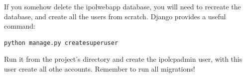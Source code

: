 If you somehow delete the ipolwebapp database, you will need to recreate the database, and create all the users from scratch. Django provides a useful command: 

\begin{lstlisting}[language=Python,firstnumber=1]
python manage.py createsuperuser
\end{lstlisting}

Run it from the project's directory and create the ipolcpadmin user, 
with this user create all othe accounts.
Remember to run all migrations!





